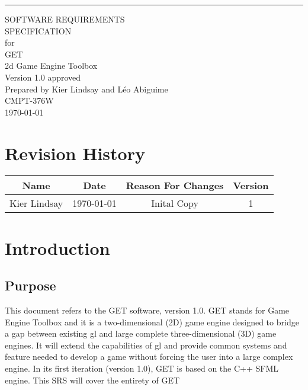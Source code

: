 \documentclass{scrreprt}
\date{}
\def\myversion{1.0 }
\begin{document}
\begin{flushright}
    \rule{16cm}{5pt}\vskip1cm
    \begin{bfseries}
        \Huge{SOFTWARE REQUIREMENTS\\ SPECIFICATION}\\
        \vspace{1.9cm}
        for\\
        \vspace{1.9cm}
        GET\\
        2d Game Engine Toolbox\\
        \vspace{1.9cm}
        \LARGE{Version \myversion approved}\\
        \vspace{1.9cm}
        Prepared by Kier Lindsay and Léo Abiguime\\
        \vspace{1.9cm}
        CMPT-376W\\
        \vspace{1.9cm}
        \today\\
    \end{bfseries}
\end{flushright}

\tableofcontents


\chapter*{Revision History}

\begin{center}
    \begin{tabular}{|c|c|c|c|}
        \hline
	    Name & Date & Reason For Changes & Version\\
        \hline
	    Kier Lindsay & \today & Inital Copy & 1\\
        \hline
    \end{tabular}
\end{center}

\chapter{Introduction}

\section{Purpose}
This document refers to the GET software, version 1.0. GET stands for Game Engine Toolbox and it is a two-dimensional (2D) game engine designed to bridge a gap between existing \gls{gl} and large complete three-dimensional (3D) game engines.  It will extend the capabilities of \gls{gl} and provide common systems and feature needed to develop a game without forcing the user into a large complex engine. In its first iteration (version 1.0), GET is based on the C++ SFML engine. This SRS will cover the entirety of GET
\end{document}
